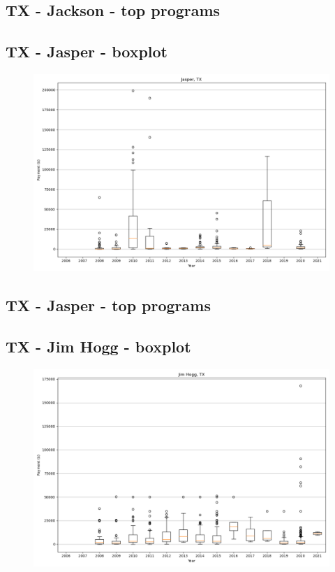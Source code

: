 \subsection*{TX - Jackson - top programs}

\newpage
\subsection*{TX - Jasper - boxplot}
\begin{figure}[h]
\centering
\includegraphics[width=7in]{../output/boxplots/counties/Jasper-TX_boxplot.png}
\end{figure}


\subsection*{TX - Jasper - top programs}

\newpage
\subsection*{TX - Jim Hogg - boxplot}
\begin{figure}[h]
\centering
\includegraphics[width=7in]{../output/boxplots/counties/Jim Hogg-TX_boxplot.png}
\end{figure}


